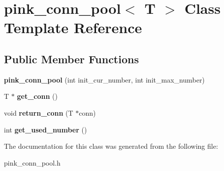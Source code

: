 \hypertarget{classpink__conn__pool}{}\section{pink\+\_\+conn\+\_\+pool$<$ T $>$ Class Template Reference}
\label{classpink__conn__pool}
\subsection*{Public Member Functions}
\begin{DoxyCompactItemize}
\item 
\mbox{\label{classpink__conn__pool_a5c557c48815d595f7897f6abc8e55758}} 
{\bfseries pink\+\_\+conn\+\_\+pool} (int init\+\_\+cur\+\_\+number, int init\+\_\+max\+\_\+number)
\item 
\mbox{\label{classpink__conn__pool_a1b053641006c7f00fd4764fea40f410c}} 
T $\ast$ {\bfseries get\+\_\+conn} ()
\item 
\mbox{\label{classpink__conn__pool_a331df25708f142559d051ab8859ed707}} 
void {\bfseries return\+\_\+conn} (T $\ast$conn)
\item 
\mbox{\label{classpink__conn__pool_a90965493d13fc28f0060ca6fed7d12a4}} 
int {\bfseries get\+\_\+used\+\_\+number} ()
\end{DoxyCompactItemize}


The documentation for this class was generated from the following file\+:\begin{DoxyCompactItemize}
\item 
pink\+\_\+conn\+\_\+pool.\+h\end{DoxyCompactItemize}
